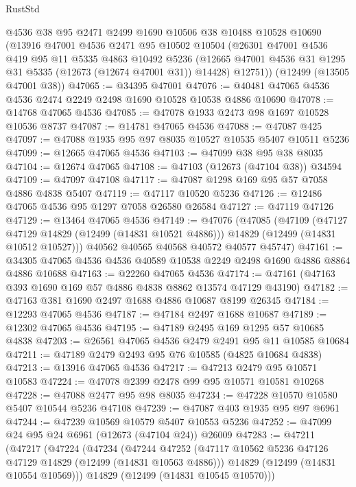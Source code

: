\begin{lexlean}{RustStd}
\begin{coremodule}
    @4536
    @38
    @95
    @2471
    @2499
    @1690
    @10506
    @38
    @10488
    @10528
    @10690
    (@13916
      @47001
      @4536
      @2471
      @95
      @10502
      @10504
      (@26301
        @47001
        @4536
        @419
        @95
        @11
        @5335
        @4863
        @10492
        @5236
        (@12665 @47001 @4536 @31 @1295 @31 @5335 (@12673 (@12674 @47001 @31)) @14428)
        @12751))
    (@12499 (@13505 @47001 @38))
@47065 := @34395 @47001
@47076 := @40481 @47065 @4536 @4536 @2474 @2249 @2498 @1690 @10528 @10538 @4886 @10690
@47078 := @14768 @47065 @4536
@47085 := @47078 @1933 @2473 @98 @1697 @10528 @10536 @8737
@47087 := @14781 @47065 @4536
@47088 := @47087 @425
@47097 := @47088 @1935 @95 @97 @8035 @10527 @10535 @5407 @10511 @5236
@47099 := @12665 @47065 @4536
@47103 := @47099 @38 @95 @38 @8035
@47104 := @12674 @47065
@47108 := @47103 (@12673 (@47104 @38)) @34594
@47109 := @47097 @47108
@47117 := @47087 @1298 @169 @95 @57 @7058 @4886 @4838 @5407
@47119 := @47117 @10520 @5236
@47126 := @12486 @47065 @4536 @95 @1297 @7058 @26580 @26584
@47127 := @47119 @47126
@47129 := @13464 @47065 @4536
@47149 := @47076
    (@47085
      (@47109
        (@47127 @47129 @14829 (@12499 (@14831 @10521 @4886)))
        @14829
        (@12499 (@14831 @10512 @10527)))
      @40562
      @40565
      @40568
      @40572
      @40577
      @45747)
@47161 := @34305 @47065 @4536 @4536 @40589 @10538 @2249 @2498 @1690 @4886 @8864 @4886 @10688
@47163 := @22260 @47065 @4536
@47174 := @47161 (@47163 @393 @1690 @169 @57 @4886 @4838 @8862 @13574 @47129 @43190)
@47182 := @47163 @381 @1690 @2497 @1688 @4886 @10687 @8199 @26345
@47184 := @12293 @47065 @4536
@47187 := @47184 @2497 @1688 @10687
@47189 := @12302 @47065 @4536
@47195 := @47189 @2495 @169 @1295 @57 @10685 @4838
@47203 := @26561 @47065 @4536 @2479 @2491 @95 @11 @10585 @10684
@47211 := @47189 @2479 @2493 @95 @76 @10585 (@4825 @10684 @4838)
@47213 := @13916 @47065 @4536
@47217 := @47213 @2479 @95 @10571 @10583
@47224 := @47078 @2399 @2478 @99 @95 @10571 @10581 @10268
@47228 := @47088 @2477 @95 @98 @8035
@47234 := @47228 @10570 @10580 @5407 @10544 @5236 @47108
@47239 := @47087 @403 @1935 @95 @97 @6961
@47244 := @47239 @10569 @10579 @5407 @10553 @5236
@47252 := @47099 @24 @95 @24 @6961 (@12673 (@47104 @24)) @26009
@47283 := @47211
    (@47217
      (@47224
        (@47234
          (@47244
            @47252
            (@47117 @10562 @5236 @47126 @47129 @14829 (@12499 (@14831 @10563 @4886)))
            @14829
            (@12499 (@14831 @10554 @10569)))
          @14829
          (@12499 (@14831 @10545 @10570)))

\end{coremodule}
\end{lexlean}
